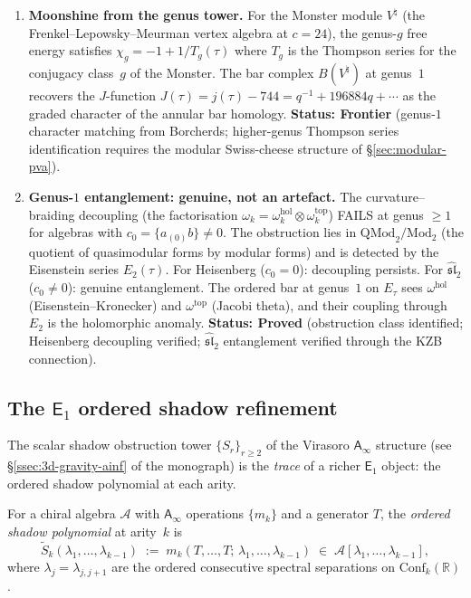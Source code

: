 \documentclass[11pt]{article}
\newcommand{\cA}{\mathcal{A}}
\newcommand{\fsl}{\mathfrak{sl}}
\newcommand{\R}{\mathbb{R}}
\newcommand{\Eone}{\mathsf{E}_1}
\newcommand{\Ainf}{\mathsf{A}_{\infty}}
\begin{document}
\begin{enumerate}[label=\textbf{S\arabic*.},leftmargin=2.5em]
\item \textbf{Moonshine from the genus tower.}
For the Monster module $V^\natural$ (the Frenkel--Lepowsky--Meurman
vertex algebra at $c = 24$), the genus-$g$ free energy satisfies
$\chi_g = -1 + 1/T_g(\tau)$ where $T_g$ is the Thompson series
for the conjugacy class~$g$ of the Monster.  The bar complex
$B(V^\natural)$ at genus~$1$ recovers the $J$-function
$J(\tau) = j(\tau) - 744 = q^{-1} + 196884q + \cdots$
as the graded character of the annular bar homology.
\textbf{Status: Frontier} (genus-$1$ character matching from
Borcherds; higher-genus Thompson series identification requires
the modular Swiss-cheese structure of \S\ref{sec:modular-pva}).

\item \textbf{Genus-$1$ entanglement: genuine, not an artefact.}
The curvature--braiding decoupling (the factorisation
$\omega_k = \omega_k^{\mathrm{hol}} \otimes \omega_k^{\mathrm{top}}$)
FAILS at genus $\ge 1$ for algebras with $c_0 = \{a_{(0)}b\} \ne 0$.
The obstruction lies in $\mathrm{QMod}_2 / \mathrm{Mod}_2$ (the quotient
of quasimodular forms by modular forms) and is detected by the
Eisenstein series $E_2(\tau)$.  For Heisenberg ($c_0 = 0$): decoupling
persists.  For $\hat{\fsl}_2$ ($c_0 \ne 0$): genuine entanglement.
The ordered bar at genus~$1$ on $E_\tau$ sees
$\omega^{\mathrm{hol}}$ (Eisenstein--Kronecker)
and $\omega^{\mathrm{top}}$ (Jacobi theta), and their coupling
through $E_2$ is the holomorphic anomaly.
\textbf{Status: Proved} (obstruction class identified; Heisenberg
decoupling verified; $\hat{\fsl}_2$ entanglement verified through
the KZB connection).

\end{enumerate}

\subsection{The $\Eone$ ordered shadow refinement}
\label{ssec:ordered-shadow-refinement}

The scalar shadow obstruction tower $\{S_r\}_{r \ge 2}$ of the Virasoro
$\Ainf$ structure (see \S\ref{ssec:3d-gravity-ainf} of the monograph)
is the \emph{trace} of a richer $\Eone$ object: the ordered
shadow polynomial at each arity.

\begin{definition}
\label{def:ordered-shadow-poly}
For a chiral algebra $\cA$ with $\Ainf$ operations $\{m_k\}$
and a generator $T$, the \emph{ordered shadow polynomial} at
arity~$k$ is
\[
\widetilde{S}_k(\lambda_1, \ldots, \lambda_{k-1})
\;:=\;
m_k(T, \ldots, T;\, \lambda_1, \ldots, \lambda_{k-1})
\;\in\;
\cA[\lambda_1, \ldots, \lambda_{k-1}],
\]
where $\lambda_j = \lambda_{j,j+1}$ are the ordered consecutive
spectral separations on $\mathrm{Conf}_k(\R)$.
\end{definition}
\end{document}
